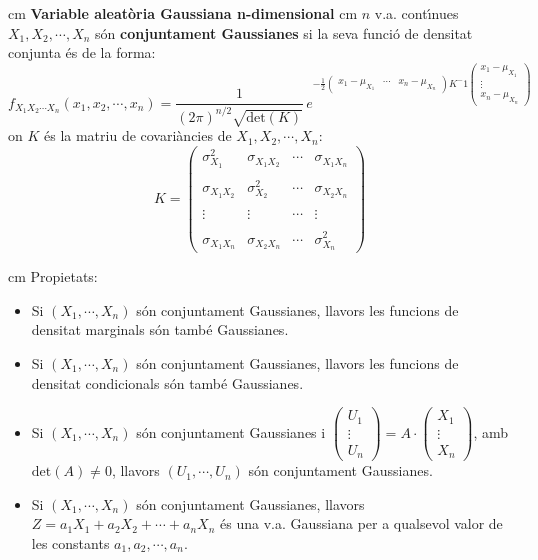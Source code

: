 \documentclass{article}
\begin{document}
 cm
\noindent
\textbf{\large Variable aleat\`oria Gaussiana n-dimensional}
 cm
\noindent
$n$ v.a. cont\'\i nues $X_1, X_2, \cdots, X_n$ s\'on \textbf{conjuntament Gaussianes} si la seva
funci\'o de densitat conjunta \'es de la forma:
\[
f_{X_1 X_2 \cdots X_n}(x_1, x_2, \cdots, x_n)=\frac{1}{(2 \pi)^{n/2} \sqrt{\mathrm{det}(K)}} \, e^{-\frac{1}{2} 
\begin{pmatrix} x_1-\mu_{X_1} & \cdots & x_n - \mu_{X_n} \end{pmatrix} K^-1 
\begin{pmatrix} x_1-\mu_{X_1} \\ \vdots \\ x_n - \mu_{X_n} \end{pmatrix} }
\]
\noindent
on $K$ \'es la matriu de covari\`ancies de $X_1, X_2, \cdots, X_n$: 
\[
K=\begin{pmatrix} 
\sigma_{X_1}^2 & \sigma_{X_1 X_2} & \cdots & \sigma_{X_1 X_n}\\ \\
\sigma_{X_1 X_2} & \sigma_{X_2}^2 & \cdots & \sigma_{X_2 X_n}\\ \\
\vdots & \vdots & \cdots & \vdots\\ \\
\sigma_{X_1 X_n} & \sigma_{X_2 X_n} & \cdots & \sigma_{X_n}^2
\end{pmatrix}
\]

 cm
\noindent
Propietats:
\begin{itemize}
\item Si $(X_1, \cdots, X_n)$ s\'on conjuntament Gaussianes,
llavors les funcions de densitat marginals s\'on tamb\'e Gaussianes.

\item Si $(X_1, \cdots, X_n)$ s\'on conjuntament Gaussianes, llavors les funcions de densitat condicionals 
s\'on tamb\'e Gaussianes.

\item Si $(X_1, \cdots, X_n)$ s\'on conjuntament Gaussianes i 
$\begin{pmatrix} U_1 \\ \vdots \\ U_n \end{pmatrix}=A \cdot \begin{pmatrix} X_1 \\ \vdots \\ X_n \end{pmatrix}$, 
amb $\mathrm{det}(A)\neq 0$, llavors $(U_1, \cdots,  U_n)$ s\'on conjuntament Gaussianes.

\item Si $(X_1, \cdots, X_n)$ s\'on conjuntament Gaussianes, llavors $Z=a_1 X_1+ a_2 X_2 + \cdots + a_n X_n$ 
\'es una v.a. Gaussiana per a qualsevol valor de les constants $a_1, a_2, \cdots, a_n$.
\end{itemize}
\end{document}
